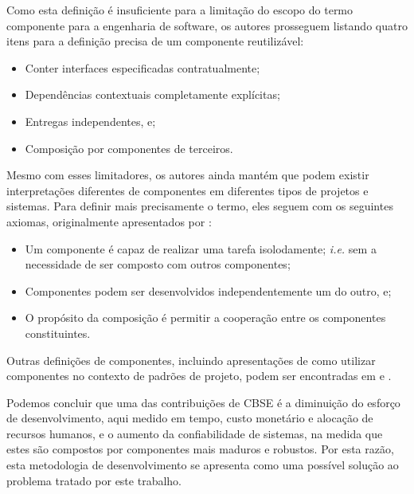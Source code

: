Como esta definição é insuficiente para a limitação do escopo do termo componente para a engenharia de software, os autores prosseguem listando quatro itens para a definição precisa de um componente reutilizável:

\begin{itemize}
    \item Conter interfaces especificadas contratualmente;
    \item Dependências contextuais completamente explícitas;
    \item Entregas independentes, e;
    \item Composição por componentes de terceiros.
\end{itemize}

Mesmo com esses limitadores, os autores ainda mantém que podem existir interpretações diferentes de componentes em diferentes tipos de projetos e sistemas. Para definir mais precisamente o termo, eles seguem com os seguintes axiomas, originalmente apresentados por :

\begin{itemize}
    \item Um componente é capaz de realizar uma tarefa isolodamente; \textit{i.e.} sem a necessidade de ser composto com outros componentes;
    \item Componentes podem ser desenvolvidos independentemente um do outro, e;
    \item O propósito da composição é permitir a cooperação entre os componentes constituintes.
\end{itemize}

Outras definições de componentes, incluindo apresentações de como utilizar componentes no contexto de padrões de projeto, podem ser encontradas em  e .

Podemos concluir que uma das contribuições de CBSE é a diminuição do esforço de desenvolvimento, aqui medido em tempo, custo monetário e alocação de recursos humanos, e o aumento da confiabilidade de sistemas, na medida que estes são compostos por componentes mais maduros e robustos. Por esta razão, esta metodologia de desenvolvimento se apresenta como uma possível solução ao problema tratado por este trabalho.

